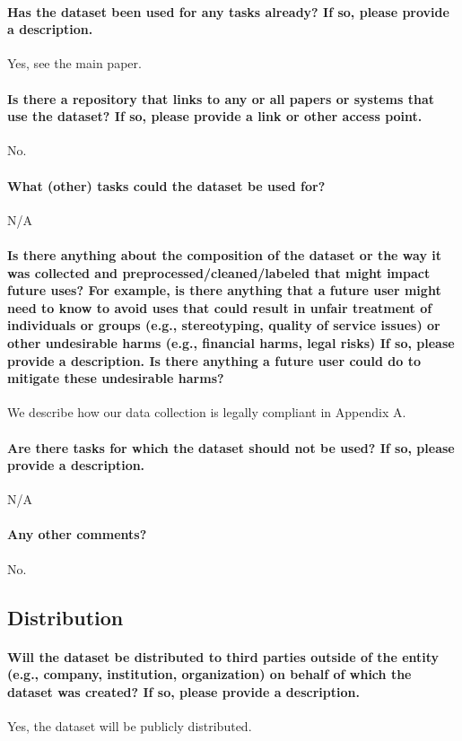 \paragraph{Has the dataset been used for any tasks already? If so, please provide
a description.}
Yes, see the main paper.

\paragraph{Is there a repository that links to any or all papers or systems that
use the dataset? If so, please provide a link or other access point.}
No.

\paragraph{What (other) tasks could the dataset be used for?}
N/A

\paragraph{Is there anything about the composition of the dataset or the way
it was collected and preprocessed/cleaned/labeled that might impact future uses? For example, is there anything that a future user
might need to know to avoid uses that could result in unfair treatment
of individuals or groups (e.g., stereotyping, quality of service issues) or
other undesirable harms (e.g., financial harms, legal risks) If so, please
provide a description. Is there anything a future user could do to mitigate
these undesirable harms?}
We describe how our data collection is legally compliant in Appendix A.

\paragraph{Are there tasks for which the dataset should not be used? If so,
please provide a description.}
N/A

\paragraph{Any other comments?}
No.

\subsection{Distribution}
\paragraph{Will the dataset be distributed to third parties outside of the entity (e.g., company, institution, organization) on behalf of which
the dataset was created? If so, please provide a description.}
Yes, the dataset will be publicly distributed.

